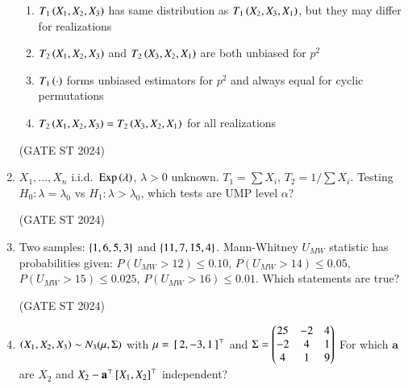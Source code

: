 \documentclass[journal,12pt,onecolumn]{IEEEtran}
\theoremstyle{remark}
\begin{document}
\begin{enumerate}
\begin{enumerate}
\item $T_1\left(X_1,X_2,X_3\right)$ has same distribution as $T_1\left(X_2,X_3,X_1\right)$, but they may differ for realizations
\item $T_2\left(X_1,X_2,X_3\right)$ and $T_2\left(X_3,X_2,X_1\right)$ are both unbiased for $p^2$
\item $T_1\left(\cdot\right)$ forms unbiased estimators for $p^2$ and always equal for cyclic permutations
\item $T_2\left(X_1,X_2,X_3\right) = T_2\left(X_3,X_2,X_1\right)$ for all realizations
\end{enumerate}
\hfill (GATE ST 2024)
\item
$X_1,\dots,X_n$ i.i.d.\ $\mathrm{Exp}\left(\lambda\right)$, $\lambda>0$ unknown.  
$T_1 = \sum X_i$, $T_2 = 1/\sum X_i$.  
Testing $H_0: \lambda=\lambda_0$ vs $H_1: \lambda>\lambda_0$, which tests are UMP level $\alpha$?

\begin{enumerate}
\end{enumerate}
\hfill (GATE ST 2024)
\item
Two samples: $\left\{1,6,5,3\right\}$ and $\left\{11,7,15,4\right\}$. Mann\--Whitney $U_{MW}$ statistic has probabilities given:  
$P(U_{MW} > 12) \le 0.10$, $P(U_{MW}>14)\le 0.05$, $P(U_{MW}>15)\le 0.025$, $P(U_{MW}>16)\le 0.01$.  
Which statements are true?

\begin{enumerate}
\end{enumerate}
\hfill (GATE ST 2024)
\item
$\left(X_1,X_2,X_3\right) \sim N_3(\mu,\Sigma)$ with $\mu ={}\left[\,2,-3,1\,\right]^\top$ and  
$
\Sigma = \begin{pmatrix}
25 & -2 & 4\\
-2 & 4 & 1\\
4 & 1 & 9 \end{pmatrix}
$
For which $\mathbf{a}$ are $X_2$ and $X_2 - \mathbf{a}^\top{}\left[X_1,X_2\right]^\top$ independent?


\end{enumerate}
\end{document}
